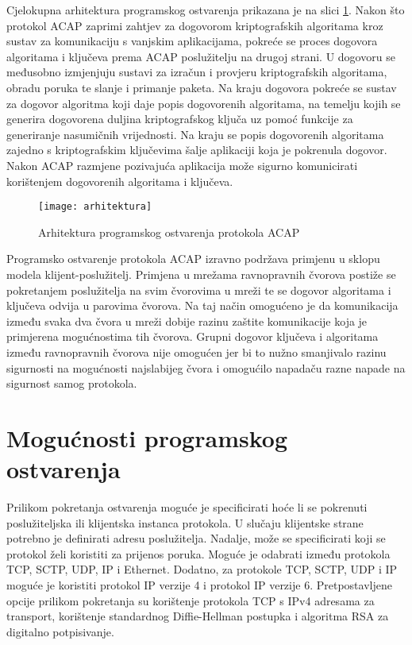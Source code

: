 Cjelokupna arhitektura programskog ostvarenja prikazana je na slici \ref{fig:impl}.
Nakon što protokol ACAP zaprimi zahtjev za dogovorom kriptografskih algoritama
kroz sustav za komunikaciju s vanjskim aplikacijama, pokreće se proces dogovora
algoritama i ključeva prema ACAP poslužitelju na drugoj strani. U dogovoru se
međusobno izmjenjuju sustavi za izračun i provjeru kriptografskih algoritama,
obradu poruka te slanje i primanje paketa. Na kraju dogovora
pokreće se sustav za dogovor algoritma koji daje popis dogovorenih algoritama,
na temelju kojih se generira dogovorena duljina kriptografskog ključa uz pomoć
funkcije za generiranje nasumičnih vrijednosti. Na kraju
se popis dogovorenih algoritama zajedno s kriptografskim ključevima šalje
aplikaciji koja je pokrenula dogovor. Nakon ACAP razmjene pozivajuća aplikacija
može sigurno komunicirati korištenjem dogovorenih algoritama i ključeva.

\begin{figure}[htb]
    \centering
    \texttt{[image: arhitektura]}
    \caption{Arhitektura programskog ostvarenja protokola ACAP}
    \label{fig:impl}
\end{figure}

Programsko ostvarenje protokola ACAP izravno podržava primjenu u sklopu modela
klijent-poslužitelj.
Primjena u mrežama ravnopravnih čvorova
postiže se pokretanjem poslužitelja na svim čvorovima u mreži te se dogovor
algoritama i ključeva odvija u parovima čvorova. Na taj način omogućeno je da
komunikacija između svaka dva čvora u mreži dobije razinu zaštite komunikacije
koja je primjerena mogućnostima tih čvorova. Grupni dogovor ključeva i
algoritama između ravnopravnih čvorova nije omogućen jer bi to nužno smanjivalo
razinu sigurnosti na mogućnosti najslabijeg čvora i omogućilo napadaču
razne napade na sigurnost samog protokola.

\section{Mogućnosti programskog ostvarenja}
Prilikom pokretanja ostvarenja moguće je specificirati hoće li se pokrenuti
poslužiteljska ili klijentska instanca protokola. U slučaju klijentske strane
potrebno je definirati adresu poslužitelja. Nadalje, može se specificirati koji
se protokol želi koristiti za prijenos poruka. Moguće je odabrati između
protokola TCP, SCTP, UDP, IP i Ethernet. Dodatno, za protokole TCP,
SCTP, UDP i IP moguće je koristiti protokol IP verzije 4 i protokol IP verzije 6.
Pretpostavljene opcije prilikom pokretanja su korištenje protokola TCP s IPv4
adresama za transport, korištenje standardnog Diffie-Hellman postupka i
algoritma RSA za digitalno potpisivanje.

